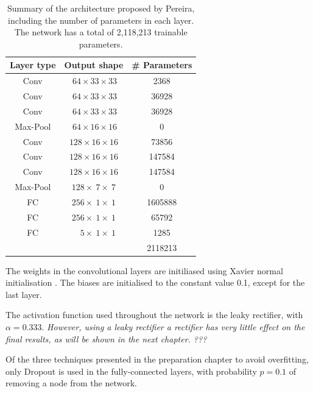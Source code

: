\documentclass[12pt,a4paper,twoside,openright]{report}
\begin{document}
\begin{table}
\centering	
\label{table:pereira_weights}
\begin{tabular}{ c c S[table-format=7.0] } 
\textbf{Layer type} & \textbf{Output shape} & \textbf{\# Parameters} \\
 \hline
 Conv 		& $\ 64 	\times 33 	\times 33$ 	& 2368 \\ 
 Conv 		& $\ 64 	\times 33 	\times 33$ 	& 36928 \\ 
 Conv 		& $\ 64 	\times 33 	\times 33$	& 36928 \\ 
Max-Pool 	& $\ 64 	\times 16 	\times 16$ 	& 0\\
 Conv 		& $128 		 \times 16 	\times 16$	& 73856 \\ 
 Conv 		& $128 		\times 16 	\times 16$ 	& 147584 \\ 
 Conv 		& $128 		\times 16 	\times 16$ 	& 147584 \\ 
Max-Pool 	& $128 		\times\ 7 	\times\ 7$	& 0\\
FC			& $256 		\times\ 1 	\times\ 1$	& 1605888\\
FC			& $256 		\times\ 1 	\times\ 1$	& 65792\\
FC			& $\quad 5 	\times\ 1 	\times\ 1$ 	& 1285\\
\hhline{~~=}
\rule{0pt}{3ex}    
&& 2118213\\
\end{tabular}
\caption[Summary of the architecture proposed by Pereira, including the number of parameters in each layer.]{Summary of the architecture proposed by Pereira, including the number of parameters in each layer. The network has a total of 2,118,213 trainable parameters.}
\end{table}


The weights in the convolutional layers are initiliased using Xavier normal initialisation \cite{xavier_init}. The biases are initialised to the constant value 0.1, except for the last layer.

The activation function used throughout the network is the leaky rectifier, with  $\alpha = 0.333$. \textit{However, using a leaky rectifier a rectifier has very little effect on the final results, as will be shown in the next chapter. ???}

Of the three techniques presented in the preparation chapter to avoid overfitting, only Dropout \cite{dropout} is used in the fully-connected layers, with probability $p=0.1$ of removing a node from the network.
\end{document}
